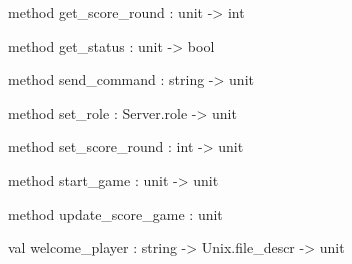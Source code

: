 \documentclass[11pt]{article}
\begin{document}
\begin{ocamldocobjectend}
\label{method:Server.player.get-underscorescore-underscoreround}\begin{ocamldoccode}
method get_score_round : unit -> int
\end{ocamldoccode}


\label{method:Server.player.get-underscorestatus}\begin{ocamldoccode}
method get_status : unit -> bool
\end{ocamldoccode}


\label{method:Server.player.send-underscorecommand}\begin{ocamldoccode}
method send_command : string -> unit
\end{ocamldoccode}


\label{method:Server.player.set-underscorerole}\begin{ocamldoccode}
method set_role : Server.role -> unit
\end{ocamldoccode}


\label{method:Server.player.set-underscorescore-underscoreround}\begin{ocamldoccode}
method set_score_round : int -> unit
\end{ocamldoccode}


\label{method:Server.player.start-underscoregame}\begin{ocamldoccode}
method start_game : unit -> unit
\end{ocamldoccode}


\label{method:Server.player.update-underscorescore-underscoregame}\begin{ocamldoccode}
method update_score_game : unit
\end{ocamldoccode}
\end{ocamldocobjectend}






\label{val:Server.welcome-underscoreplayer}\begin{ocamldoccode}
val welcome_player : string -> Unix.file_descr -> unit
\end{ocamldoccode}
\end{document}
